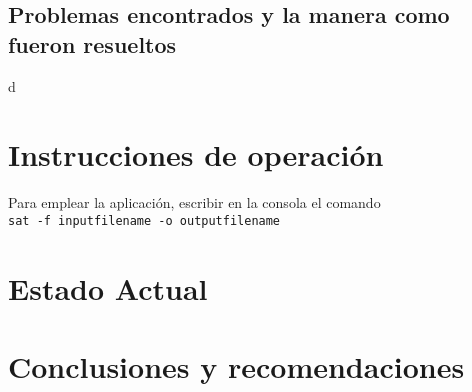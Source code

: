 \documentclass[12pt,lettersize]{article}
\begin{document}
\subsection{Problemas encontrados y la manera como fueron resueltos}


\begin{texttt}
d
\end{texttt}

\section{Instrucciones de operación}
Para emplear la aplicación, escribir en la consola el comando
\\ \texttt{sat -f inputfilename -o outputfilename}
\section{Estado Actual}

\section{Conclusiones y recomendaciones}
\end{document}
